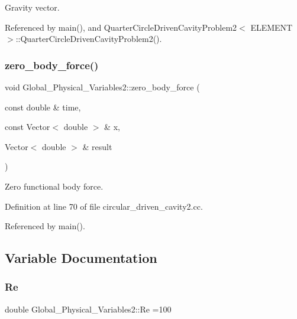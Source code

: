 Gravity vector. 



Referenced by main(), and Quarter\+Circle\+Driven\+Cavity\+Problem2$<$ E\+L\+E\+M\+E\+N\+T $>$\+::\+Quarter\+Circle\+Driven\+Cavity\+Problem2().

\mbox{\label{namespaceGlobal__Physical__Variables2_a3820ea1a672c3e2709095fc366e40ca7}} 
\subsubsection{\texorpdfstring{zero\+\_\+body\+\_\+force()}{zero\_body\_force()}}
{\footnotesize\ttfamily void Global\+\_\+\+Physical\+\_\+\+Variables2\+::zero\+\_\+body\+\_\+force (\begin{DoxyParamCaption}\item[{const double \&}]{time,  }\item[{const Vector$<$ double $>$ \&}]{x,  }\item[{Vector$<$ double $>$ \&}]{result }\end{DoxyParamCaption})}



Zero functional body force. 



Definition at line 70 of file circular\+\_\+driven\+\_\+cavity2.\+cc.



Referenced by main().



\subsection{Variable Documentation}
\mbox{\label{namespaceGlobal__Physical__Variables2_afce617c1bd6726b29fa0e1f7c892a955}} 
\subsubsection{\texorpdfstring{Re}{Re}}
{\footnotesize\ttfamily double Global\+\_\+\+Physical\+\_\+\+Variables2\+::\+Re =100}



